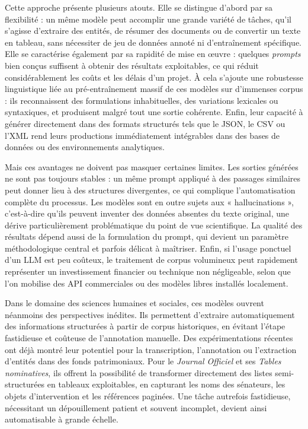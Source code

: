 Cette approche présente plusieurs atouts. Elle se distingue d’abord par sa flexibilité : un même modèle peut accomplir une grande variété de tâches, qu’il s’agisse d’extraire des entités, de résumer des documents ou de convertir un texte en tableau, sans nécessiter de jeu de données annoté ni d’entraînement spécifique. Elle se caractérise également par sa rapidité de mise en œuvre : quelques \emph{prompts} bien conçus suffisent à obtenir des résultats exploitables, ce qui réduit considérablement les coûts et les délais d’un projet. À cela s’ajoute une robustesse linguistique liée au pré-entraînement massif de ces modèles sur d’immenses corpus : ils reconnaissent des formulations inhabituelles, des variations lexicales ou syntaxiques, et produisent malgré tout une sortie cohérente. Enfin, leur capacité à générer directement dans des formats structurés tels que le JSON, le CSV ou l’XML rend leurs productions immédiatement intégrables dans des bases de données ou des environnements analytiques.

Mais ces avantages ne doivent pas masquer certaines limites. Les sorties générées ne sont pas toujours stables : un même prompt appliqué à des passages similaires peut donner lieu à des structures divergentes, ce qui complique l’automatisation complète du processus. Les modèles sont en outre sujets aux « hallucinations », c’est-à-dire qu’ils peuvent inventer des données absentes du texte original, une dérive particulièrement problématique du point de vue scientifique. La qualité des résultats dépend aussi de la formulation du prompt, qui devient un paramètre méthodologique central et parfois délicat à maîtriser. Enfin, si l’usage ponctuel d’un LLM est peu coûteux, le traitement de corpus volumineux peut rapidement représenter un investissement financier ou technique non négligeable, selon que l’on mobilise des API commerciales ou des modèles libres installés localement.

Dans le domaine des sciences humaines et sociales, ces modèles ouvrent néanmoins des perspectives inédites. Ils permettent d’extraire automatiquement des informations structurées à partir de corpus historiques, en évitant l’étape fastidieuse et coûteuse de l’annotation manuelle. Des expérimentations récentes ont déjà montré leur potentiel pour la transcription, l’annotation ou l’extraction d’entités dans des fonds patrimoniaux. Pour le \emph{Journal Officiel} et ses \emph{Tables nominatives}, ils offrent la possibilité de transformer directement des listes semi-structurées en tableaux exploitables, en capturant les noms des sénateurs, les objets d’intervention et les références paginées. Une tâche autrefois fastidieuse, nécessitant un dépouillement patient et souvent incomplet, devient ainsi automatisable à grande échelle.

